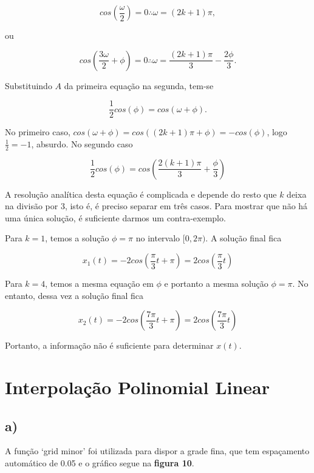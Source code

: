\documentclass[a4paper, 12pt]{article}
\begin{document}
$$cos(\frac{\omega}{2})=0 \therefore \omega = (2k+1)\pi, $$

ou

$$cos(\frac{3\omega}{2} + \phi)=0 \therefore \omega = \frac{(2k+1)\pi}{3} - \frac{2\phi}{3}.$$

Substituindo $A$ da primeira equação na segunda, tem-se

$$\frac{1}{2}cos(\phi)=cos(\omega + \phi).$$

No primeiro caso, $cos(\omega + \phi)=cos((2k+1)\pi + \phi)=-cos(\phi)$, logo $\frac{1}{2}=-1$, absurdo. No segundo caso

$$\frac{1}{2}cos(\phi) = cos(\frac{2(k+1)\pi}{3} + \frac{\phi}{3})$$

A resolução analítica desta equação é complicada e depende do resto que $k$ deixa na divisão por $3$, isto é, é preciso separar em três casos. Para mostrar que não há uma única solução, é suficiente darmos um contra-exemplo. 

Para $k=1$, temos a solução $\phi=\pi$ no intervalo $[0, 2\pi).$ A solução final fica

$$x_1(t)=-2cos(\frac{\pi}{3}t + \pi)=2cos(\frac{\pi}{3}t)$$

Para $k=4$, temos a mesma equação em $\phi$ e portanto a mesma solução $\phi=\pi$. No entanto, dessa vez a solução final fica

$$x_2(t)=-2cos(\frac{7\pi}{3}t + \pi)=2cos(\frac{7\pi}{3}t)$$

Portanto, a informação não é suficiente para determinar $x(t)$.

\section{Interpolação Polinomial Linear}

\subsection{a)}

A função ‘grid minor’ foi utilizada para dispor a grade fina, que tem espaçamento automático de 0.05 e o gráfico segue na \textbf{figura 10}.


\end{document}

